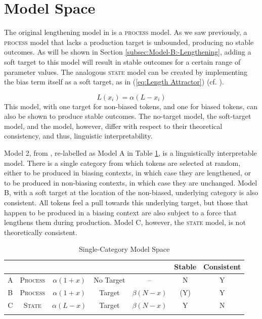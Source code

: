 \section{\label{sec:Model-Interpretation}Model Space}

The original lengthening model in 
is a \textsc{process} model. As we saw previously, a \textsc{process}
model that lacks a production target is unbounded, producing no stable
outcomes. As will be shown in Section \ref{subsec:Model-B:-Lengthening},
adding a soft target to this model will result in stable outcomes
for a certain range of parameter values. The analogous \textsc{state}
model can be created by implementing the bias term itself as a soft
target, as in (\ref{eq:Length Attractor}) (cf. \citealt{soskuthy2013phonetic}). 

\begin{equation}
L(x_{i})=\alpha(L-x_{i})\label{eq:Length Attractor}
\end{equation}
This model, with one target for non-biased tokens, and one for biased
tokens, can also be shown to produce stable outcomes. The no-target
 model, the soft-target  model, and the
 model, however, differ with respect to their theoretical
consistency, and thus, linguistic interpretability. 

Model 2, from , re-labelled
as Model A in Table \ref{tab: Model Comparison-1}, is a linguistically
interpretable model. There is a single category from which tokens
are selected at random, either to be produced in biasing contexts,
in which case they are lengthened, or to be produced in non-biasing
contexts, in which case they are unchanged. Model B, with a soft target
at the location of the non-biased, underlying category is also consistent.
All tokens feel a pull towards this underlying target, but those that
happen to be produced in a biasing context are also subject to a force
that lengthens them during production. Model C, however, the \textsc{state}
model, is not theoretically consistent. 

\begin{table}[h]\footnotesize
\caption{Single-Category Model Space\label{tab: Model Comparison-1}}
\begin{tabular}{ccccccc}
\lsptoprule
 & \multicolumn{2}{c}{} & \multicolumn{2}{c}{} & Stable & Consistent\tabularnewline
\midrule
A & \textsc{Process} & $\alpha(1+x)$ & No Target & – & N & Y\tabularnewline
B & \textsc{Process} & $\alpha(1+x)$ & Target & $\beta(N-x)$ & (Y) & Y\tabularnewline
C & \textsc{State} & $\alpha(L-x)$ & Target & $\beta(N-x)$ & Y & N\tabularnewline
\lspbottomrule
\end{tabular}
\end{table}

